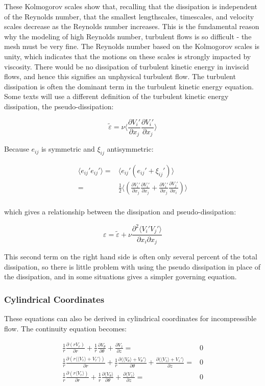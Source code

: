 \documentclass[10pt]{article}
\newcommand{\beq}{\begin{equation}}
\newcommand{\eeq}{\end{equation}}
\newcommand{\beqa}{\begin{equation}\begin{aligned}}
\newcommand{\eeqa}{\end{aligned}\end{equation}}
\newcommand{\la}{\langle}
\newcommand{\ra}{\rangle}
\begin{document}
\begin{flushleft}
These Kolmogorov scales show that, recalling that the dissipation is independent of the Reynolds number, that the smallest lengthscales, timescales, and velocity scales decrease as the Reynolds number increases. This is the fundamental reason why the modeling of high Reynolds number, turbulent flows is so difficult - the mesh must be very fine. The Reynolds number based on the Kolmogorov scales is unity, which indicates that the motions on these scales is strongly impacted by viscosity. There would be no dissipation of turbulent kinetic energy in inviscid flows, and hence this signifies an unphysical turbulent flow. The turbulent dissipation is often the dominant term in the turbulent kinetic energy equation. Some texts will use a different definition of the turbulent kinetic energy dissipation, the pseudo-dissipation:

\beq
\label{eq:pseudo}
\tilde{\varepsilon}=\nu\la\frac{\partial V_i'}{\partial x_j}\frac{\partial V_i'}{\partial x_j}\ra
\eeq

Because \(e_{ij}\) is symmetric and \(\xi_{ij}\) antisymmetric:

\beqa
\la e_{ij}'e_{ij}'\ra=&\la e_{ij}'\left(e_{ij}'+\xi_{ij}'\right)\ra\\
=&\frac{1}{2}\la\left(\frac{\partial V_i'}{\partial x_j}\frac{\partial V_i'}{\partial x_j}+\frac{\partial V_i'}{\partial x_j}\frac{\partial V_j'}{\partial x_i}\right)\ra\\
\eeqa

which gives a relationship between the dissipation and pseudo-dissipation:

\beq
\varepsilon=\tilde{\varepsilon}+\nu\frac{\partial^2\la V_i'V_j'\ra}{\partial x_i\partial x_j}
\eeq

This second term on the right hand side is often only several percent of the total dissipation, so there is little problem with using the pseudo dissipation in place of the dissipation, and in some situations gives a simpler governing equation. 






\subsubsection{Cylindrical Coordinates}

These equations can also be derived in cylindrical coordinates for incompressible flow. The continuity equation becomes:

\beqa
\frac{1}{r}\frac{\partial(rV_r)}{\partial r}+\frac{1}{r}\frac{\partial V_{\theta}}{\partial\theta}+\frac{\partial V_z}{\partial z}=&0\\
\frac{1}{r}\frac{\partial(r\la\la V_r\ra+V_r'\ra)}{\partial r}+\frac{1}{r}\frac{\partial \la\la V_{\theta}\ra+V_{\theta}'\ra}{\partial\theta}+\frac{\partial \la\la V_z\ra+V_z'\ra}{\partial z}=&0\\
\frac{1}{r}\frac{\partial(r\la V_r\ra)}{\partial r}+\frac{1}{r}\frac{\partial \la V_{\theta}\ra}{\partial\theta}+\frac{\partial \la V_z\ra}{\partial z}=&0\\
\eeqa


\end{flushleft}
\end{document}

